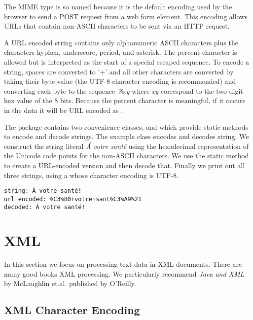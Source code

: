 The MIME type 
is so named because it is the default encoding used by the browser
to send a POST request from a web form element.
This encoding allows URLs that contain non-ASCII characters to be sent via an HTTP request.

A URL encoded string contains only alphanumeric ASCII characters plus the characters
hyphen, underscore, period, and asterisk. 
The percent character is allowed 
but is interpreted as the start of a special escaped sequence.
To encode a string, spaces are converted to '+' and
all other characters are converted by taking their byte value
(the UTF-8 character encoding is recommended)
and converting each byte to the sequence \emph{\%xy} where \emph{xy} correspond to the
two-digit hex value of the 8 bits.
Because the percent character is meaningful,
if it occurs in the data it will be URL encoded as .

The  package contains two convenience classes, 
and  which provide static methods to encode and decode strings.
The example class  encodes and decodes string.
%
%
%
We construct the string literal \emph{\'{A} votre sant\'{e}} using the hexadecimal
representation of the Unicode code points for the non-ASCII characters.
We use the static method  to create a URL-encoded version
and then decode that.  Finally we print out all three strings, using a
 whose character encoding is UTF-8.
%
\begin{verbatim}  
string: À votre santé!
url encoded: %C3%80+votre+sant%C3%A9%21
decoded: À votre santé!
\end{verbatim}


\section{XML}

In this section we focus on processing text data in XML documents.
There are many good books XML processing.
We particularly recommend \emph{Java and XML} by McLaughlin et.al.
published by O'Reilly.

\subsection{XML Character Encoding}

